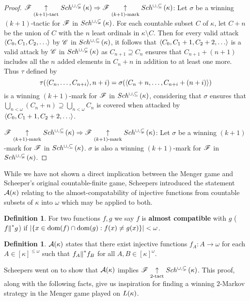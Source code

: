 \documentclass{amsart}
\theoremstyle{definition}
\newtheorem{definition}[theorem]{Definition}
\begin{document}
\begin{proof}
  \(\mathscr{F} \underset{(k+1)\text{-tact}}{\uparrow}Sch^{\cup,\subsetneq}\left({\kappa}\right)
    \Rightarrow
  \mathscr{F} \underset{(k+1)\text{-mark}}{\uparrow}Sch^{\cup,\subseteq}\left({\kappa}\right)\):
  Let \(\sigma\) be a winning \((k+1)\)-tactic for \(\mathscr{F}\) in
  \(Sch^{\cup,\subsetneq}\left({\kappa}\right)\). For each countable subset \(C\) of \(\kappa\), let \(C+n\)
  be the union of \(C\) with the \(n\) least ordinals in \(\kappa\setminus C\).
  Then for every valid attack \(\<C_0,C_1,C_2,\dots\>\) by \(\mathscr{C}\) in
  \(Sch^{\cup,\subseteq}\left({\kappa}\right)\), it follows that \(\<C_0,C_1+1,C_2+2,\dots\>\) is a
  valid attack by \(\mathscr{C}\) in \(Sch^{\cup,\subsetneq}\left({\kappa}\right)\) as
  \(C_{n+1}\supseteq C_n\) ensures that
  \(C_{n+1}+(n+1)\) includes all the \(n\) added elements in \(C_n+n\)
  in addition to at least one more.
  Thus \(\tau\) defined by
    \[
      \tau(\langle C_n,\dots,C_{n+i}\rangle,n+i)
        =
      \sigma(\langle C_n+n,\dots,C_{n+i}+(n+i)\rangle)
    \]
  is a winning \((k+1)\)-mark for \(\mathscr{F}\) in \(Sch^{\cup,\subseteq}\left({\kappa}\right)\),
  considering that \(\sigma\) ensures that
  \(\bigcup_{n<\omega}(C_n+n)\supseteq\bigcup_{n<\omega}C_n\)
  is covered when attacked by \(\<C_0,C_1+1,C_2+2,\dots\>\).

  \(\mathscr{F} \underset{(k+1)\text{-mark}}{\uparrow}Sch^{\cup,\subseteq}\left({\kappa}\right)
    \Rightarrow
  \mathscr{F} \underset{(k+1)\text{-mark}}{\uparrow}Sch^{\cup,\subsetneq}\left({\kappa}\right)\):
  Let \(\sigma\) be a winning \((k+1)\)-mark for \(\mathscr{F}\) in
  \(Sch^{\cup,\subseteq}\left({\kappa}\right)\). \(\sigma\) is also a winning
  \((k+1)\)-mark for \(\mathscr{F}\)
  in \(Sch^{\cup,\subsetneq}\left({\kappa}\right)\).
\end{proof}

While we have not shown a direct implication between the Menger game and
Scheeper's original countable-finite game, Scheepers introduced the statement
\(\mathcal{A}(\kappa)\) relating to the almost-compatability of injective functions
from countable subsets of \(\kappa\) into \(\omega\) which may be applied to
both.

\begin{definition}
  For two functions \(f,g\) we say \(f\) is \textbf{almost compatible} with
  \(g\) (\(f{\parallel}^* g\)) if \(|\{x\in\textrm{dom}(f)\cap\textrm{dom}(g):f(x)\not=g(x)\}|<\omega\).
\end{definition}

\begin{definition}
  \(\mathcal{A}(\kappa)\) states that there exist injective functions
  \(f_A:A\to\omega\) for each \(A\in[\kappa]^{\leq\omega}\) such that
  \(f_A{\parallel}^* f_B\) for all \(A,B\in[\kappa]^\omega\).
\end{definition}

Scheepers went on to show that \(\mathcal{A}(\kappa)\) implies
\(\mathscr{F} \underset{2\text{-tact}}{\uparrow} Sch^{\cup,\subsetneq}\left({\kappa}\right)\). This proof, along with the following
facts, give us inspiration for
finding a winning \(2\)-Markov strategy in the Menger game played on
\(L(\kappa)\).
\end{document}
